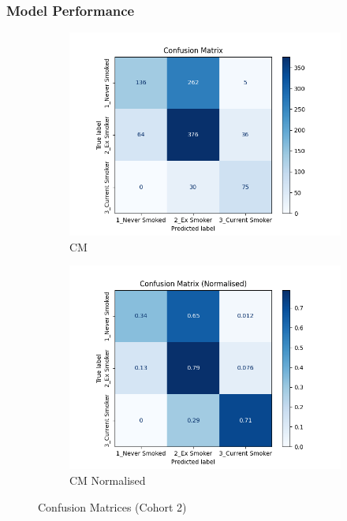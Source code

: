\documentclass{article}
\begin{document}
\subsubsection{Model Performance}
\begin{figure}
    \begin{subfigure}{0.49\textwidth}
        \centering
        \includegraphics[width=\linewidth]{cohort2_cm.png}
        \caption{CM}
    \end{subfigure}
    \hfill
    \begin{subfigure}{0.49\textwidth}
        \centering
        \includegraphics[width=\linewidth]{cohort2_cm_n.png}
        \caption{CM Normalised}
    \end{subfigure}
    \caption{Confusion Matrices (Cohort 2)}
\end{figure}
\end{document}
